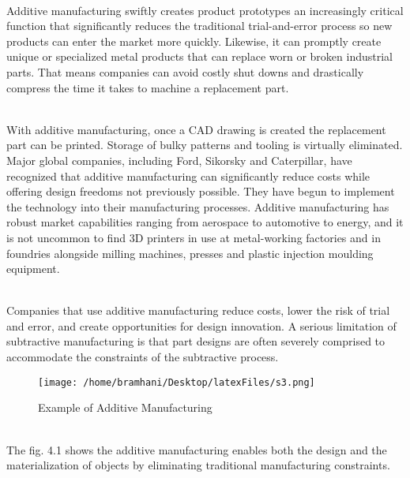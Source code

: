 \documentclass[12pt,a4paper]{report}
\begin{document}
	\indent
	\\Additive manufacturing swiftly creates product prototypes an increasingly critical function
	that significantly reduces the traditional trial-and-error process so new products can enter the
	market more quickly. Likewise, it can promptly create unique or specialized metal products that can
	replace worn or broken industrial parts. That means companies can avoid costly shut downs and
	drastically compress the time it takes to machine a replacement part.\par
	
	\indent
	\\With additive manufacturing, once a CAD drawing is created the replacement part can be
	printed. Storage of bulky patterns and tooling is virtually eliminated. Major global companies,
	including Ford, Sikorsky and Caterpillar, have recognized that additive manufacturing can
	significantly reduce costs while offering design freedoms not previously possible. They have begun
	to implement the technology into their manufacturing processes. Additive manufacturing has robust
	market capabilities ranging from aerospace to automotive to energy, and it is not uncommon to find
	3D printers in use at metal-working factories and in foundries alongside milling machines, presses
	and plastic injection moulding equipment.\par
	
	
	\indent
	\\Companies that use additive manufacturing reduce costs, lower the risk of trial and error, and
	create opportunities for design innovation. A serious limitation of subtractive manufacturing is that
	part designs are often severely comprised to accommodate the constraints of the subtractive process.\par
	
	\begin{figure}[H]
		\centering
		\texttt{[image: /home/bramhani/Desktop/latexFiles/s3.png]}
		\label{fig:Example of Additive Manufacturing}
		\caption{Example of Additive Manufacturing}
	\end{figure}
	
	
	\indent
	\\The fig. 4.1 shows the additive manufacturing enables both the design and the materialization
	of objects by eliminating traditional manufacturing constraints.\par
	
\end{document}
